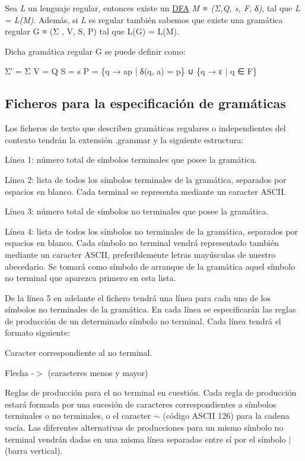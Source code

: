 Sea {\itshape L} un lenguaje regular, entonces existe un \mbox{\hyperlink{class_d_f_a}{D\+FA}} {\itshape M ≡ (Σ,Q, s, F, δ)}, tal que {\itshape L = L(\+M)}. Además, si {\itshape L} es regular también sabemos que existe una gramática regular G ≡ (Σ \textquotesingle{}, V, S, P) tal que L(\+G) = L(\+M).

Dicha gramática regular G se puede definir como\+:


\begin{DoxyCode}
Σ′ = Σ  
V = Q  
S = s  
P = \{q → ap | δ(q, a) = p\} ∪ \{q → ε | q ∈ F\}
\end{DoxyCode}


\subsection*{Ficheros para la especificación de gramáticas}

Los ficheros de texto que describen gramáticas regulares o independientes del contexto tendrán la extensión .grammar y la siguiente estructura\+:


\begin{DoxyItemize}
\item Línea 1\+: número total de símbolos terminales que posee la gramática.
\item Línea 2\+: lista de todos los símbolos terminales de la gramática, separados por espacios en blanco. Cada terminal se representa mediante un caracter A\+S\+C\+II.
\item Línea 3\+: número total de símbolos no terminales que posee la gramática.
\item Línea 4\+: lista de todos los símbolos no terminales de la gramática, separados por espacios en blanco. Cada símbolo no terminal vendrá representado también mediante un caracter A\+S\+C\+II, preferiblemente letras mayúsculas de nuestro abecedario. Se tomará como símbolo de arranque de la gramática aquel símbolo no terminal que aparezca primero en esta lista.
\item De la línea 5 en adelante el fichero tendrá una línea para cada uno de los símbolos no terminales de la gramática. En cada línea se especificarán las reglas de producción de un determinado símbolo no terminal. Cada línea tendrá el formato siguiente\+:
\begin{DoxyItemize}
\item Caracter correspondiente al no terminal.
\item Flecha \textquotesingle{}-\/$>$\textquotesingle{} (caracteres menos y mayor)
\item Reglas de producción para el no terminal en cuestión. Cada regla de producción estará formada por una sucesión de caracteres correspondientes a símbolos terminales o no terminales, o el caracter $\sim$ (código A\+S\+C\+II 126) para la cadena vacía. Las diferentes alternativas de producciones para un mismo símbolo no terminal vendrán dadas en una misma línea separadas entre sí por el símbolo \textquotesingle{}$\vert$\textquotesingle{} (barra vertical).
\end{DoxyItemize}
\end{DoxyItemize}


